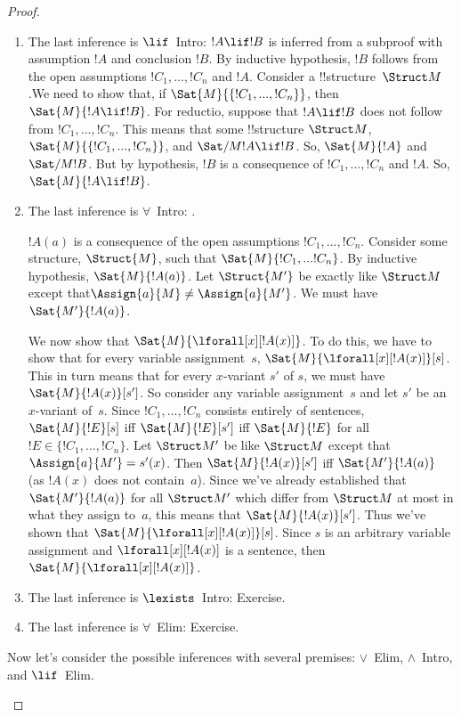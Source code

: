 \documentclass[../../include/open-logic-section]{subfiles}
\begin{document}
\begin{proof}
\begin{enumerate}
\item The last inference is $\lif$~Intro: $!A \lif !B$ is inferred from a
subproof with assumption $!A$ and conclusion $!B$. By inductive
hypothesis, $!B$ follows from the open assumptions $!C_1,...,!C_n$ 
and $!A$. Consider a !!{structure}~$\Struct M$.We need to show 
that, if $\Sat{M}{\{!C_1,...,!C_n\}}$, then $\Sat{M}{!A \lif !B}$.
For reductio, suppose that $!A \lif !B$ does not follow from
$!C_1,...,!C_n$. This means that some !!{structure}
$\Struct M$, $\Sat{M}{\{!C_1,...,!C_n\}}$, and $\Sat/{M}{!A \lif !B}$. So,
$\Sat{M}{!A}$ and $\Sat/{M}{!B}$. But
by hypothesis, $!B$ is a consequence of $!C_1,...,!C_n$ and $!A$. So,
$\Sat{M}{!A \lif !B}$.
  
\item The last inference is $\forall$~Intro: .
 
$!A(a)$ is a consequence of the open assumptions $!C_1,...,!C_n$.
Consider some structure, $\Struct{M}$, such that $\Sat{M}{!C_1,...!C_n}$.
By inductive hypothesis, $\Sat{M}{!A(a)}$.
 Let $\Struct{M'}$ be exactly like $\Struct M$ except
that$\Assign{a}{M} \neq \Assign{a}{M'}$. We must have $\Sat{M'}{!A(a)}$.

  We now show that $\Sat{M}{\lforall[x][!A(x)]}$.  To do this, we have
  to show that for every variable assignment~$s$,
  $\Sat{M}{\lforall[x][!A(x)]}[s]$.  This in turn means that for every
  $x$-variant $s'$ of $s$, we must have $\Sat{M}{!A(x)}[s']$.  So
  consider any variable assignment~$s$ and let $s'$ be an $x$-variant
  of~$s$.  Since $!C_1,...,!C_n$ consists entirely of sentences,
  $\Sat{M}{!E}[s]$ iff $\Sat{M}{!E}[s']$ iff $\Sat{M}{!E}$ for all
  $!E \in \{!C_1,...,!C_n\}$.  Let $\Struct M'$ be like $\Struct M$
  except that $\Assign{a}{M'} = s'(x)$.  Then $\Sat{M}{!A(x)}[s']$ iff
  $\Sat{M'}{!A(a)}$ (as $!A(x)$ does not contain~$a$).  Since we've
  already established that $\Sat{M'}{!A(a)}$ for all $\Struct M'$
  which differ from $\Struct M$ at most in what they assign to~$a$,
  this means that $\Sat{M}{!A(x)}[s']$.  Thus we've shown that
  $\Sat{M}{\lforall[x][!A(x)]}[s]$.  Since $s$ is an arbitrary variable
  assignment and $\lforall[x][!A(x)]$ is a sentence, then
  $\Sat{M}{\lforall[x][!A(x)]}$.

  
\item The last inference is $\lexists$~Intro: Exercise.

\item The last inference is $\forall$~Elim: Exercise.


\end{enumerate}
Now let's consider the possible inferences with several premises:
$\lor$~Elim, $\land$~Intro, and $\lif$~Elim.
\begin{enumerate}


\end{enumerate}
\end{proof}
\end{document}
